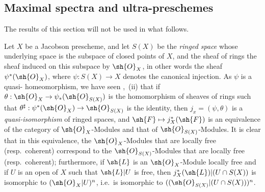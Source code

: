 \subsection{Maximal spectra and ultra-preschemes}
\label{subsection:IV.10.9}

The results of this section will not be used in what follows.

\begin{env}[10.9.1]
\label{IV.10.9.1}
Let $X$ be a Jacobson prescheme, and let $S(X)$ be the \emph{ringed space} whose underlying space is the subspace of closed points of $X$, and the sheaf of rings the sheaf induced on this subspace by $\sh{O}_X$, in other words the sheaf $\psi^*(\sh{O}_X)$, where $\psi:S(X)\to X$ denotes the canonical injection.
As $\psi$ is a quasi-
homeomorphism, we have seen ,~(ii) that if $\theta:\sh{O}_X\to\psi_*(\sh{O}_{S(X)})$ is the homomorphism of sheaves of rings such that $\theta^\sharp:\psi^*(\sh{O}_X)\to\sh{O}_{S(X)}$ is the identity, then $j_x=(\psi,\theta)$ is a \emph{quasi-isomorphism} of ringed spaces, and $\sh{F}\mapsto j_X^*(\sh{F})$ is an equivalence of the category of $\sh{O}_X$-Modules and that of $\sh{O}_{S(X)}$-Modules.
It is clear that in this equivalence, the $\sh{O}_X$-Modules that are locally free (resp.\ coherent) correspond to the $\sh{O}_{S(X)}$-Modules that are locally free (resp.\ coherent); furthermore, if $\sh{L}$ is an $\sh{O}_X$-Module locally free and if $U$ is an open of $X$ such that $\sh{L}|U$ is free, then $j_X^*(\sh{L})|(U\cap S(X))$ is isomorphic to $(\sh{O}_X|U)^n$, i.e.\ is isomorphic to $((\sh{O}_{S(X)}|(U\cap S(X)))^n$.
\end{env}

